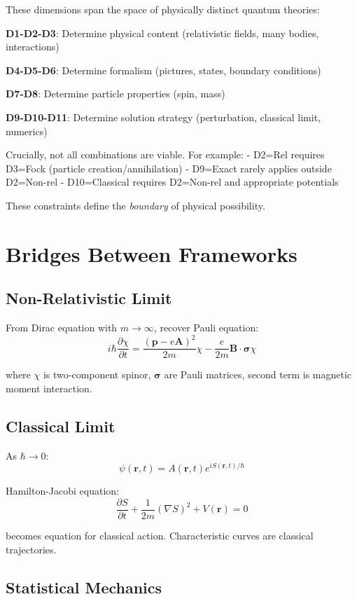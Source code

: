 \documentclass[12pt,openany,oneside]{book}
\begin{document}
{{{{These dimensions span the space of physically distinct quantum theories:

\textbf{D1-D2-D3}: Determine physical content (relativistic fields, many bodies, interactions)

\textbf{D4-D5-D6}: Determine formalism (pictures, states, boundary conditions)

\textbf{D7-D8}: Determine particle properties (spin, mass)

\textbf{D9-D10-D11}: Determine solution strategy (perturbation, classical limit, numerics)

Crucially, not all combinations are viable. For example:
- D2=Rel requires D3=Fock (particle creation/annihilation)
- D9=Exact rarely applies outside D2=Non-rel
- D10=Classical requires D2=Non-rel and appropriate potentials

These constraints define the \textit{boundary} of physical possibility.

\chapter{Bridges Between Frameworks}

\section{Non-Relativistic Limit}

From Dirac equation with $m \to \infty$, recover Pauli equation:
\[
i\hbar\frac{\partial\chi}{\partial t} = \frac{(\mathbf{p} - e\mathbf{A})^2}{2m}\chi - \frac{e}{2m}\mathbf{B} \cdot \boldsymbol{\sigma}\chi
\]

where $\chi$ is two-component spinor, $\boldsymbol{\sigma}$ are Pauli matrices, second term is magnetic moment interaction.

\section{Classical Limit}

As $\hbar \to 0$:
\[
\psi(\mathbf{r},t) = A(\mathbf{r},t)e^{iS(\mathbf{r},t)/\hbar}
\]

Hamilton-Jacobi equation:
\[
\frac{\partial S}{\partial t} + \frac{1}{2m}(\nabla S)^2 + V(\mathbf{r}) = 0
\]

becomes equation for classical action. Characteristic curves are classical trajectories.

\section{Statistical Mechanics}

}}}}
\end{document}

